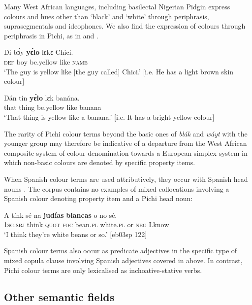Many West African languages, including basilectal Nigerian Pidgin \citep[286]{Faraclas1996} express colours and hues other than ‘black’ and ‘white’ through periphrasis, suprasegmentals and ideophones. We also find the expression of colours through periphrasis in Pichi, as in  and .


\ea%
    \label{ex:key:1751}
    \gll Di  bɔ́y \textbf{yɛ́lo}  lɛkɛ  Chici.\\
\textsc{def}  boy  be.yellow  like  \textsc{name}\\

\glt ‘The guy is yellow like [the guy called] Chici.’ [i.e. He has a light brown skin colour]
\z


\ea%
    \label{ex:key:1752}
    \gll Dán  tín     \textbf{yɛ́lo}  lɛk  banána.\\
that  thing  be.yellow  like  banana\\

\glt ‘That thing is yellow like a banana.’ [i.e. It has a bright yellow colour]
\z

The rarity of Pichi colour terms beyond the basic ones of \textit{blák} and \textit{wáyt} with the younger group may therefore be indicative of a departure from the West African composite system of colour denomination towards a European simplex system in which non-basic colours are denoted by specific property items. 


When Spanish colour terms are used attributively, they occur with Spanish head nouns . The corpus contains no examples of mixed collocations involving a Spanish colour denoting property item and a Pichi head noun:



\ea%
    \label{ex:key:1753}
    \gll A    tínk    sé    na  \textbf{judías}  \textbf{blancas}  o  no sé.\\
\textsc{1sg.sbj}  think  \textsc{quot}    \textsc{foc}  bean.\textsc{pl}  white.\textsc{pl}  or  \textsc{neg}  I.know\\

\glt ‘I think they’re white beans or so.’ [eb03sp 122]
\z

Spanish colour terms also occur as predicate adjectives in the specific type of mixed copula clause involving Spanish adjectives covered in  above. In contrast, Pichi colour terms are only lexicalised as inchoative-stative verbs.	 

\subsection{Other semantic fields}

